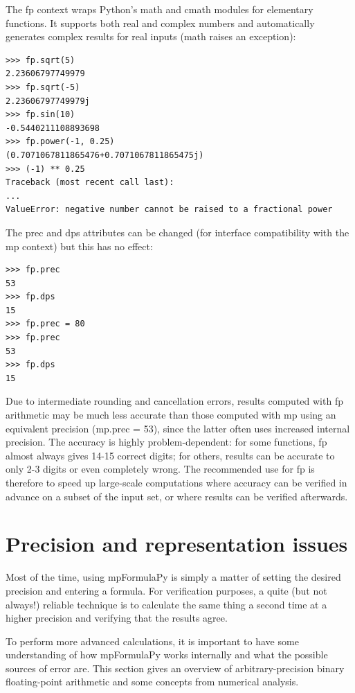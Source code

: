 The fp context wraps Python's math and cmath modules for elementary functions. It supports both real and complex numbers and automatically generates complex results for real inputs (math raises an exception):

\begin{lstlisting}
>>> fp.sqrt(5)
2.23606797749979
>>> fp.sqrt(-5)
2.23606797749979j
>>> fp.sin(10)
-0.5440211108893698
>>> fp.power(-1, 0.25)
(0.7071067811865476+0.7071067811865475j)
>>> (-1) ** 0.25
Traceback (most recent call last):
...
ValueError: negative number cannot be raised to a fractional power
\end{lstlisting}


The prec and dps attributes can be changed (for interface compatibility with the mp context) but this has no effect:

\begin{lstlisting}
>>> fp.prec
53
>>> fp.dps
15
>>> fp.prec = 80
>>> fp.prec
53
>>> fp.dps
15
\end{lstlisting}


Due to intermediate rounding and cancellation errors, results computed with fp arithmetic may be much less accurate than those computed with mp using an equivalent precision (mp.prec = 53), since the latter often uses increased internal precision. The accuracy is highly problem-dependent: for some functions, fp almost always gives 14-15 correct digits; for others, results can be accurate to only 2-3 digits or even completely wrong. The recommended use for fp is therefore to speed up large-scale computations where accuracy can be verified in advance on a subset of the input set, or where results can be verified afterwards.




\newpage
\section{Precision and representation issues}

Most of the time, using mpFormulaPy is simply a matter of setting the desired precision and entering a formula. For verification purposes, a quite (but not always!) reliable technique is to calculate the same thing a second time at a higher precision and verifying that the results
agree.

\vpara
To perform more advanced calculations, it is important to have some understanding of how mpFormulaPy works internally and what the possible sources of error are. This section gives an overview of arbitrary-precision binary floating-point arithmetic and some concepts from
numerical analysis.

